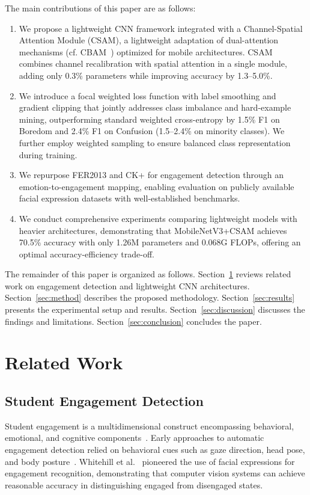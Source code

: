 \documentclass[apajournal,article,submit,pdftex,moreauthors]{Definitions/mdpi}
\begin{document}
The main contributions of this paper are as follows:
\begin{enumerate}
\item We propose a lightweight CNN framework integrated with a Channel-Spatial Attention Module (CSAM), a lightweight adaptation of dual-attention mechanisms (cf. CBAM~\citep{woo2018cbam}) optimized for mobile architectures. CSAM combines channel recalibration with spatial attention in a single module, adding only 0.3\% parameters while improving accuracy by 1.3--5.0\%.
\item We introduce a focal weighted loss function with label smoothing and gradient clipping that jointly addresses class imbalance and hard-example mining, outperforming standard weighted cross-entropy by 1.5\% F1 on Boredom and 2.4\% F1 on Confusion (1.5--2.4\% on minority classes). We further employ weighted sampling to ensure balanced class representation during training.
\item We repurpose FER2013 and CK+ for engagement detection through an emotion-to-engagement mapping, enabling evaluation on publicly available facial expression datasets with well-established benchmarks.
\item We conduct comprehensive experiments comparing lightweight models with heavier architectures, demonstrating that MobileNetV3+CSAM achieves 70.5\% accuracy with only 1.26M parameters and 0.068G FLOPs, offering an optimal accuracy-efficiency trade-off.
\end{enumerate}

The remainder of this paper is organized as follows. Section~\ref{sec:related} reviews related work on engagement detection and lightweight CNN architectures. Section~\ref{sec:method} describes the proposed methodology. Section~\ref{sec:results} presents the experimental setup and results. Section~\ref{sec:discussion} discusses the findings and limitations. Section~\ref{sec:conclusion} concludes the paper.

\section{Related Work}
\label{sec:related}

\subsection{Student Engagement Detection}

Student engagement is a multidimensional construct encompassing behavioral, emotional, and cognitive components~\citep{fredricks2004school}. Early approaches to automatic engagement detection relied on behavioral cues such as gaze direction, head pose, and body posture~\citep{whitehill2014faces}. Whitehill et al.~\citep{whitehill2014faces} pioneered the use of facial expressions for engagement recognition, demonstrating that computer vision systems can achieve reasonable accuracy in distinguishing engaged from disengaged states.
\end{document}
